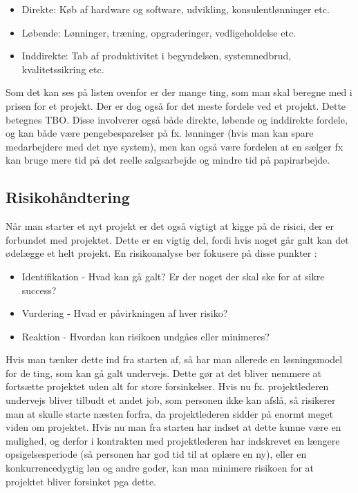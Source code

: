 \documentclass[10pt,a4paper,danish]{article}
\begin{document}
\begin{itemize}
\item Direkte: Køb af hardware og software, udvikling, konsulentlønninger etc.
\item Løbende: Lønninger, træning, opgraderinger, vedligeholdelse etc.
\item Inddirekte: Tab af produktivitet i begyndelsen, systemnedbrud, kvalitetssikring etc.
\end{itemize}

Som det kan ses på listen ovenfor \cite[~s. 53]{Marchewka} er der mange ting, som man skal beregne med i prisen for et projekt. Der er dog også for det meste fordele ved et projekt. Dette betegnes TBO. Disse involverer også både direkte, løbende og inddirekte fordele, og kan både være pengebesparelser på fx. lønninger (hvis man kan spare medarbejdere med det nye system), men kan også være fordelen at en sælger fx kan bruge mere tid på det reelle salgsarbejde og mindre tid på papirarbejde.


\subsection{Risikohåndtering}




Når man starter et nyt projekt er det også vigtigt at kigge på de risici, der er forbundet med projektet. Dette er en vigtig del, fordi hvis noget går galt kan det ødelægge et helt projekt. En risikoanalyse bør fokusere på disse punkter \cite[~s. 52]{Marchewka}:

\begin{itemize}
\item Identifikation - Hvad kan gå galt? Er der noget der skal ske for at sikre success?
\item Vurdering - Hvad er påvirkningen af hver risiko?
\item Reaktion - Hvordan kan risikoen undgåes eller minimeres?
\end{itemize}

Hvis man tænker dette ind fra starten af, så har man allerede en løsningsmodel for de ting, som kan gå galt undervejs. Dette gør at det bliver nemmere at fortsætte projektet uden alt for store forsinkelser. Hvis nu fx. projektlederen undervejs bliver tilbudt et andet job, som personen ikke kan afslå, så risikerer man at skulle starte næsten forfra, da projektlederen sidder på enormt meget viden om projektet. Hvis nu man fra starten har indset at dette kunne være en mulighed, og derfor i kontrakten med projektlederen har indskrevet en længere opsigelsesperiode (så personen har god tid til at oplære en ny), eller en konkurrencedygtig løn og andre goder, kan man minimere risikoen for at projektet bliver forsinket pga dette.
\end{document}
